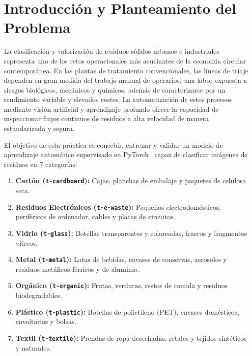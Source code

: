 \documentclass[11pt,a4paper]{article}
\begin{document}
\section{Introducción y Planteamiento del Problema}

La clasificación y valorización de residuos sólidos urbanos e industriales representa uno de los retos operacionales más acuciantes de la economía circular contemporánea. En las plantas de tratamiento convencionales, las líneas de triaje dependen en gran medida del trabajo manual de operarios, una labor expuesta a riesgos biológicos, mecánicos y químicos, además de caracterizarse por un rendimiento variable y elevados costes. La automatización de estos procesos mediante visión artificial y aprendizaje profundo ofrece la capacidad de inspeccionar flujos continuos de residuos a alta velocidad de manera estandarizada y segura.

El objetivo de esta práctica es concebir, entrenar y validar un modelo de aprendizaje automático supervisado en PyTorch~\cite{paszke2019pytorch} capaz de clasificar imágenes de residuos en 7 categorías:
\begin{enumerate}[label=\textbf{\arabic*.}]
    \item \textbf{Cartón (\texttt{t-cardboard}):} Cajas, planchas de embalaje y paquetes de celulosa seca.
    \item \textbf{Residuos Electrónicos (\texttt{t-e-waste}):} Pequeños electrodomésticos, periféricos de ordenador, cables y placas de circuitos.
    \item \textbf{Vidrio (\texttt{t-glass}):} Botellas transparentes y coloreadas, frascos y fragmentos vítreos.
    \item \textbf{Metal (\texttt{t-metal}):} Latas de bebidas, envases de conservas, aerosoles y residuos metálicos férricos y de aluminio.
    \item \textbf{Orgánico (\texttt{t-organic}):} Frutas, verduras, restos de comida y residuos biodegradables.
    \item \textbf{Plástico (\texttt{t-plastic}):} Botellas de polietileno (PET), envases domésticos, envoltorios y bolsas.
    \item \textbf{Textil (\texttt{t-textile}):} Prendas de ropa desechadas, retales y tejidos sintéticos y naturales.
\end{enumerate}
\end{document}
